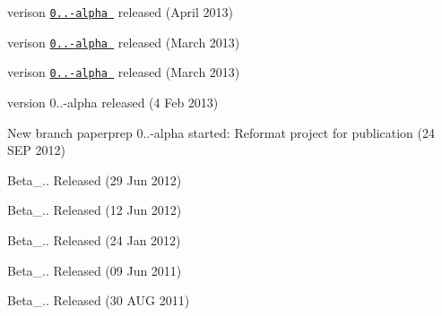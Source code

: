 
\begin{DoxyItemize}
\item verison \href{nonadmd-0.1.41-alpha.tar.gz}{\tt 0..-\/alpha } released (April 2013)
\item verison \href{nonadmd-0.1.4-alpha.tar.gz}{\tt 0..-\/alpha } released (March 2013)
\item verison \href{nonadmd-0.1.3-alpha.tar.gz}{\tt 0..-\/alpha } released (March 2013)
\item version 0..-\/alpha released (4 Feb 2013)
\item New branch paperprep 0..-\/alpha started\-: Reformat project for publication (24 S\-E\-P 2012)
\item Beta\-\_.. Released (29 Jun 2012)
\item Beta\-\_.. Released (12 Jun 2012)
\item Beta\-\_.. Released (24 Jan 2012)
\item Beta\-\_.. Released (09 Jun 2011)
\item Beta\-\_.. Released (30 A\-U\-G 2011) 
\end{DoxyItemize}